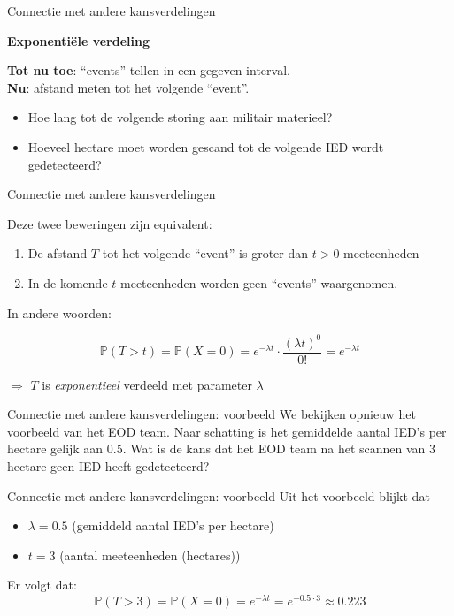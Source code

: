 \documentclass{beamer}
\newcommand{\probability}{\mathbb{P}}
\begin{document}
	\begin{frame}{Connectie met andere kansverdelingen}
		\begin{center}
			\textbf{Exponenti\"ele verdeling}
		\end{center}
		\vfill
		
		\textbf{Tot nu toe}: ``events'' tellen in een gegeven interval. \\[2ex]
		
		\textbf{Nu}: afstand meten tot het volgende ``event''.
		\vfill
		\begin{itemize}
			\item Hoe lang tot de volgende storing aan militair materieel?
			\item Hoeveel hectare moet worden gescand tot de volgende IED wordt gedetecteerd?
		\end{itemize}
	\end{frame}

	\begin{frame}{Connectie met andere kansverdelingen}
				
		Deze twee beweringen zijn equivalent:
		
		\begin{enumerate}
			\item De afstand $T$ tot het volgende ``event'' is groter dan $t > 0$ meeteenheden
			\item In de komende $t$ meeteenheden worden geen ``events'' waargenomen.
		\end{enumerate}	
		\vfill
		In andere woorden:
		
		\[ \probability(T > t) = \probability(X = 0) = e^{-\lambda t} \cdot \frac{(\lambda t)^{0}}{0!} = e^{-\lambda t} \]
		
		$ \Rightarrow$ $T$ is \textit{exponentieel} verdeeld met parameter $\lambda$

	\end{frame}

	\begin{frame}{Connectie met andere kansverdelingen: voorbeeld}
		We bekijken opnieuw het voorbeeld van het EOD team. Naar schatting is het gemiddelde aantal IED's per hectare gelijk aan 0.5.
		\vfill 
		Wat is de kans dat het EOD team na het scannen van 3 hectare geen IED heeft gedetecteerd?
	\end{frame}

	\begin{frame}{Connectie met andere kansverdelingen: voorbeeld}
		Uit het voorbeeld blijkt dat
		\begin{itemize}
			\item $\lambda = 0.5$ (gemiddeld aantal IED's per hectare)
			\item $t = 3$ (aantal meeteenheden (hectares))
		\end{itemize}
		\vfill
		Er volgt dat:
		\[
			\probability(T  > 3) = \probability(X = 0) = e^{-\lambda t} = e^{-0.5 \cdot 3} \approx 0.223 
		\]
	\end{frame}
\end{document}
